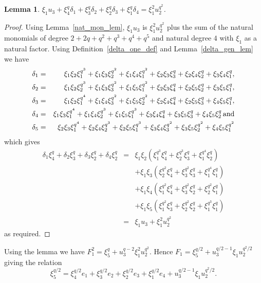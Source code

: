 \documentclass{amsart}
\newtheorem{lemma}[subsection]{Lemma}
\begin{document}
\begin{lemma}\label{O7-del-rel1} $\xi_1 u_3+\xi_4^q \delta_1+\xi_3^q \delta_2+\xi_2^q \delta_3+\xi_1^q \delta_4=\xi_1^2 u_2^{q^2}$.
\end{lemma}
\begin{proof} Using Lemma~\ref{nat_mon_lem}, $\xi_1 u_3$ is $\xi_1^2 u_2^{q^2}$ plus the sum of the natural monomials of degree
$2+2q+q^2+q^3+q^4+q^5$ and natural degree $4$ with $\xi_1$ as a natural factor. Using Definition~\ref{delta_one_def} and Lemma~\ref{delta_gen_lem}
we have
\begin{eqnarray*}
\delta_1&=&\xi_1\xi_2\xi_1^{q^3}+\xi_1\xi_3\xi_2^{q^2}+\xi_1\xi_4\xi_1^{q^2}
    +\xi_2\xi_3\xi_3^q+\xi_2\xi_4\xi_2^q+\xi_3\xi_4\xi_1^q,\\
\delta_2&=&\xi_1\xi_2\xi_2^{q^3}+\xi_1\xi_3\xi_3^{q^2}+\xi_1\xi_5\xi_1^{q^2}
    +\xi_2\xi_3\xi_4^q+\xi_2\xi_5\xi_2^q+\xi_3\xi_5\xi_1^q,\\
\delta_3&=&\xi_1\xi_2\xi_1^{q^4}+\xi_1\xi_4\xi_3^{q^2}+\xi_1\xi_5\xi_2^{q^2}
    +\xi_2\xi_4\xi_4^q+\xi_2\xi_5\xi_3^q+\xi_4\xi_5\xi_1^q,\\
\delta_4&=&\xi_1\xi_3\xi_1^{q^4}+\xi_1\xi_4\xi_2^{q^3}+\xi_1\xi_5\xi_1^{q^3}
    +\xi_3\xi_4\xi_4^q+\xi_3\xi_5\xi_3^q+\xi_4\xi_5\xi_2^q
    \,{\rm and}\\
\delta_5&=&\xi_2\xi_3\xi_1^{q^4}+\xi_2\xi_4\xi_2^{q^3}+\xi_2\xi_5\xi_1^{q^3}
       +\xi_3\xi_4\xi_3^{q^2}+\xi_3\xi_5\xi_2^{q^2}+\xi_4\xi_5\xi_1^{q^2}    
    \end{eqnarray*}
which gives
\begin{eqnarray*}
    \delta_1\xi_4^q+\delta_2\xi_3^q+\delta_3\xi_2^q+\delta_4\xi_2^q
&=&\xi_1\xi_2\left(\xi_1^{q^3}\xi_4^q+\xi_2^{q^3}\xi_3^q+\xi_1^{q^4}\xi_2^q\right)\\
&&+\xi_1\xi_3\left(\xi_2^{q^2}\xi_4^q+\xi_3^{q^2}\xi_3^q+\xi_1^{q^4}\xi_1^q\right)\\
&&+\xi_1\xi_4\left(\xi_1^{q^2}\xi_4^q+\xi_3^{q^2}\xi_2^q+\xi_2^{q^2}\xi_1^q\right)\\
&&+\xi_1\xi_5\left(\xi_1^{q^2}\xi_3^q+\xi_2^{q^2}\xi_2^q+\xi_1^{q^3}\xi_1^q\right)\\
&=&\xi_1u_3+\xi_1^2u_2^{q^2}
\end{eqnarray*}
as required.
\end{proof}

Using the lemma we have $F_1^2=\xi_5^q+u_3^{q-2}\xi_1^2u_2^{q^2}$. Hence $F_1=\xi_5^{q/2}+u_3^{q/2-1}\xi_1u_2^{q^2/2}$
giving the relation
\begin{equation}\label{O7-eqn1}
\xi_5^{q/2}=\xi_4^{q/2}e_1+\xi_3^{q/2}e_2+\xi_2^{q/2}e_3+\xi_1^{q/2}e_4+u_3^{q/2-1}\xi_1u_2^{q^2/2}.
\end{equation}
\end{document}
